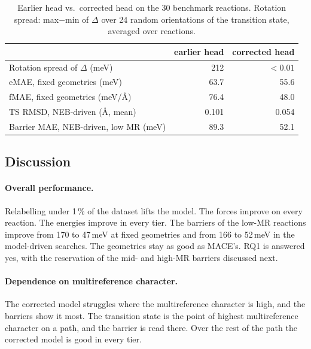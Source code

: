 \begin{table}[!htbp]
  \centering
  \caption{Earlier head vs.\ corrected head on the 30 benchmark reactions.
  Rotation spread: max$-$min of $\Delta$ over 24 random orientations of the
  transition state, averaged over reactions.}
  \label{tab:delta-audit}
  \begin{tabular}{lrr}
    \toprule
    & earlier head & corrected head \\
    \midrule
    Rotation spread of $\Delta$ (meV) & 212 & $<0.01$ \\
    eMAE, fixed geometries (meV) & 63.7 & 55.6 \\
    fMAE, fixed geometries (meV/\AA) & 76.4 & 48.0 \\
    TS RMSD, NEB-driven (\AA, mean) & 0.101 & 0.054 \\
    Barrier MAE, NEB-driven, low MR (meV) & 89.3 & 52.1 \\
    \bottomrule
  \end{tabular}
\end{table}


\subsection{Discussion}
\label{sec:delta-discussion}

\paragraph{Overall performance.} Relabelling under 1\,\% of the dataset lifts
the model. The forces improve on every reaction. The energies improve
in every tier. The barriers of the low-MR reactions improve from 170
to 47\,meV at fixed geometries and from 166 to 52\,meV in the
model-driven searches. The geometries stay as good as MACE's. RQ1 is
answered yes, with the reservation of the mid- and high-MR barriers
discussed next.

\paragraph{Dependence on multireference character.} The corrected model struggles where the
multireference character is high, and the barriers show it most. The
transition state is the point of highest multireference character on
a path, and the barrier is read there. Over the rest of the path the
corrected model is good in every tier.

